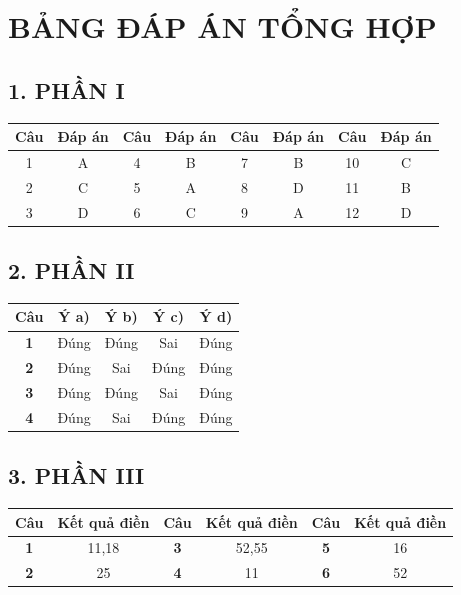 \documentclass[12pt,a4paper]{article}
\begin{document}
\newpage
\section*{BẢNG ĐÁP ÁN TỔNG HỢP}

\subsection*{1. PHẦN I}
\begin{center}
\begin{tabular}{|c|c||c|c||c|c||c|c|}
\hline
\textbf{Câu} & \textbf{Đáp án} & \textbf{Câu} & \textbf{Đáp án} & \textbf{Câu} & \textbf{Đáp án} & \textbf{Câu} & \textbf{Đáp án} \\ \hline
1 & A & 4 & B & 7 & B & 10 & C \\ \hline
2 & C & 5 & A & 8 & D & 11 & B \\ \hline
3 & D & 6 & C & 9 & A & 12 & D \\ \hline
\end{tabular}
\end{center}

\subsection*{2. PHẦN II}
\begin{center}
\begin{tabular}{|c|c|c|c|c|}
\hline
\textbf{Câu} & \textbf{Ý a)} & \textbf{Ý b)} & \textbf{Ý c)} & \textbf{Ý d)} \\ \hline
\textbf{1} & Đúng & Đúng & Sai & Đúng \\ \hline
\textbf{2} & Đúng & Sai & Đúng & Đúng \\ \hline
\textbf{3} & Đúng & Đúng & Sai & Đúng \\ \hline
\textbf{4} & Đúng & Sai & Đúng & Đúng \\ \hline
\end{tabular}
\end{center}

\subsection*{3. PHẦN III}
\begin{center}
\begin{tabular}{|c|c||c|c||c|c|}
\hline
\textbf{Câu} & \textbf{Kết quả điền} & \textbf{Câu} & \textbf{Kết quả điền} & \textbf{Câu} & \textbf{Kết quả điền} \\ \hline
\textbf{1} & 11,18 & \textbf{3} & 52,55 & \textbf{5} & 16 \\ \hline
\textbf{2} & 25 & \textbf{4} & 11 & \textbf{6} & 52 \\ \hline
\end{tabular}
\end{center}
\end{document}
